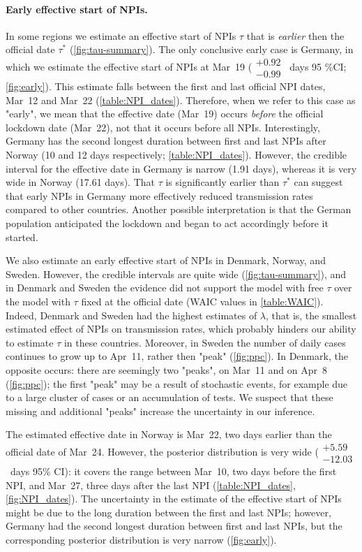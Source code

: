 \documentclass[12pt]{extarticle}
\begin{document}
\paragraph*{Early effective start of NPIs.}
In some regions we estimate an effective start of NPIs $\tau$ that is \emph{earlier} then the official date $\tau^*$ (\autoref{fig:tau-summary}).
The only conclusive early case is Germany, in which we estimate the effective start of NPIs at Mar~19 ($\substack{+0.92 \\ -0.99}$~days 95 \%CI; \autoref{fig:early}).
This estimate falls between the first and last official NPI dates, Mar~12 and Mar~22 (\autoref{table:NPI_dates}). Therefore, when we refer to this case as "early", we mean that the effective date (Mar~19) occurs \emph{before} the official lockdown date (Mar~22), not that it occurs before all NPIs.
Interestingly, Germany has the second longest duration between first and last NPIs after Norway (10 and 12 days respectively; \autoref{table:NPI_dates}).
However, the credible interval for the effective date in Germany is narrow (1.91 days), whereas it is very wide in Norway (17.61 days).
That $\tau$ is significantly earlier than $\tau^*$ can suggest that early NPIs in Germany more effectively reduced transmission rates compared to other countries. Another possible interpretation is that the German population anticipated the lockdown and began to act accordingly before it started.

We also estimate an early effective start of NPIs in Denmark, Norway, and Sweden.
However, the credible intervals are quite wide (\autoref{fig:tau-summary}), and in Denmark and Sweden the evidence did not support the model with free $\tau$ over the model with $\tau$ fixed at the official date (WAIC values in \autoref{table:WAIC}). %
Indeed, Denmark and Sweden had the highest estimates of $\lambda$, that is, the smallest estimated effect of NPIs on transmission rates, which  probably hinders our ability to estimate $\tau$ in these countries.
Moreover, in Sweden the number of daily cases continues to grow up to Apr~11, rather then "peak" (\autoref{fig:ppc}). 
In Denmark, the opposite occurs: there are seemingly two "peaks", on Mar~11 and on Apr~8 (\autoref{fig:ppc}); the first "peak" may be a result of stochastic events, for example due to a large cluster of cases or an accumulation of tests.
We suspect that these missing and additional "peaks" increase the uncertainty in our inference.

The estimated effective date in Norway is Mar~22, two days earlier than the official date of Mar~24.
However, the posterior distribution is very wide ($\substack{+5.59 \\ -12.03}$~days 95\% CI): it covers the range between Mar~10, two days before the first NPI, and Mar~27, three days after the last NPI (\autoref{table:NPI_dates}, \autoref{fig:NPI_dates}).
The uncertainty in the estimate of the effective start of NPIs might be due to the long duration between the first and last NPIs; however, Germany had the second longest duration between first and last NPIs, but the corresponding posterior distribution is very narrow (\autoref{fig:early}).
\end{document}
